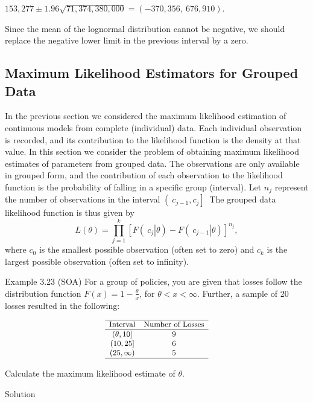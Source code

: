 \documentclass[]{book}
\theoremstyle{definition}
\theoremstyle{definition}
\theoremstyle{definition}
\theoremstyle{remark}
\begin{document}
\(153,277 \pm 1.96\sqrt{71,374,380,000} = \left( - 370,356,\ 676,910 \right)\).

Since the mean of the lognormal distribution cannot be negative, we
should replace the negative lower limit in the previous interval by a
zero.

\subsection{Maximum Likelihood Estimators for Grouped
Data}\label{MLEGrouped}

In the previous section we considered the maximum likelihood estimation
of continuous models from complete (individual) data. Each individual
observation is recorded, and its contribution to the likelihood function
is the density at that value. In this section we consider the problem of
obtaining maximum likelihood estimates of parameters from grouped data.
The observations are only available in grouped form, and the
contribution of each observation to the likelihood function is the
probability of falling in a specific group (interval). Let \(n_{j}\)
represent the number of observations in the interval
\(\left( \left. \ c_{j - 1},c_{j} \right\rbrack \right.\ \) The grouped
data likelihood function is thus given by
\[L\left( \theta \right) = \prod_{j = 1}^{k}\left\lbrack F\left( \left. \ c_{j} \right|\theta \right) - F\left( \left. \ c_{j - 1} \right|\theta \right) \right\rbrack^{n_{j}},\]
where \(c_{0}\) is the smallest possible observation (often set to zero)
and \(c_{k}\) is the largest possible observation (often set to
infinity).

Example 3.23 (SOA) For a group of policies, you are given that losses
follow the distribution function
\(F\left( x \right) = 1 - \frac{\theta}{x}\), for
\(\theta < x < \infty.\) Further, a sample of 20 losses resulted in the
following:

\[
{\small
\begin{matrix}\hline
\text{Interval} & \text{Number of Losses}  \\ \hline
(\theta, 10] & 9 \\
(10, 25] & 6 \\
(25, \infty) & 5  \\ \hline
\end{matrix}
}
\]

Calculate the maximum likelihood estimate of \(\theta\).

Solution
\end{document}
